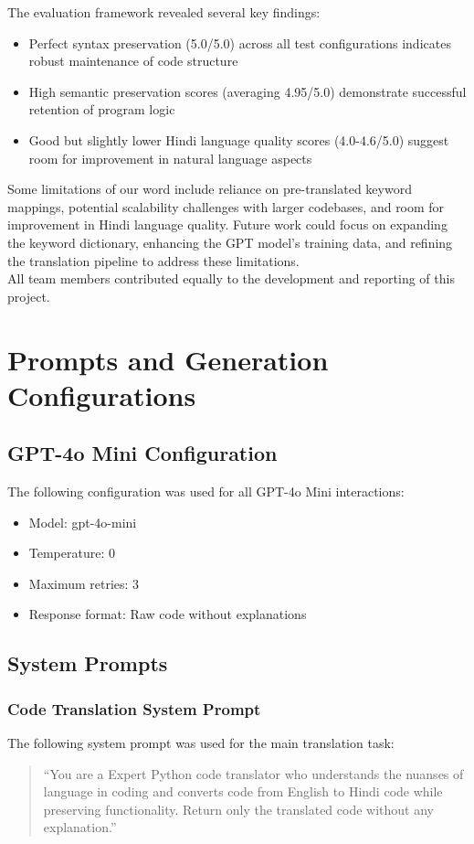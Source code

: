 \documentclass[11pt,a4paper]{article}
\begin{document}
The evaluation framework revealed several key findings:
\begin{itemize}[itemsep=0pt, topsep=0pt]
    \item Perfect syntax preservation (5.0/5.0) across all test configurations indicates robust maintenance of code structure
    \item High semantic preservation scores (averaging 4.95/5.0) demonstrate successful retention of program logic
    \item Good but slightly lower Hindi language quality scores (4.0-4.6/5.0) suggest room for improvement in natural language aspects
\end{itemize}

Some limitations of our word include reliance on pre-translated keyword mappings, potential scalability challenges with larger codebases, and room for improvement in Hindi language quality. Future work could focus on expanding the keyword dictionary, enhancing the GPT model's training data, and refining the translation pipeline to address these limitations.\\ 

All team members contributed equally to the development and reporting of this project.\\
\appendix
\label{sec:appendix}
\section{Prompts and Generation Configurations}

\subsection{GPT-4o Mini Configuration}
The following configuration was used for all GPT-4o Mini interactions:

\begin{itemize}
    \item Model: gpt-4o-mini
    \item Temperature: 0
    \item Maximum retries: 3
    \item Response format: Raw code without explanations
\end{itemize}

\subsection{System Prompts}
\subsubsection{Code Translation System Prompt}
The following system prompt was used for the main translation task:
\begin{quote}
``You are a Expert Python code translator who understands the nuanses of language in coding and converts code from English to Hindi code while preserving functionality. Return only the translated code without any explanation.''
\end{quote}
\end{document}
